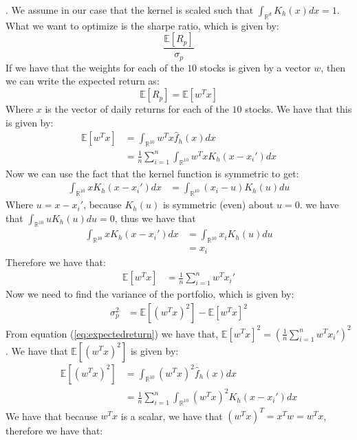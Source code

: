\documentclass[12pt]{article}
\begin{document}
. We assume 
in our  case that the kernel is scaled such that $\int_{\mathbb{R}^d} K_h(x) dx = 1$. What we want to optimize is the sharpe 
ratio, which is given by: 
\begin{equation}
    \frac{\mathbb{E}[R_p]}{\sigma_p}
\end{equation}
If we have that the weights for each of the $10$ stocks is given by a vector $w$, then we can write the expected return as:
\begin{equation}
    \mathbb{E}[R_p] = \mathbb{E}[w^T x]
\end{equation}
Where $x$ is the vector of daily returns for each of the $10$ stocks. We have that this is given by:
\begin{align}
    \mathbb{E}[w^T x] &= \int_{\mathbb{R}^{10}} w^T x \hat{f}_h(x) dx \\
    &= \frac{1}{n} \sum_{i=1}^n\int_{\mathbb{R}^{10}} w^T xK_h(x-x_i') dx
\end{align}
Now we can use the fact that the kernel function is symmetric to get:
\begin{align*}
    \int_{\mathbb{R}^{10}} xK_h(x-x_i') dx & = \int_{\mathbb{R}^{10}} (x_i-u)K_h(u) du 
\end{align*}
Where $u=x-x_i'$, because $K_h(u)$ is symmetric (even) about $u=0$. we have that $\int_{\mathbb{R}^{10}}uK_h(u) du = 0$, thus we have that 
\begin{align}
    \int_{\mathbb{R}^{10}} xK_h(x-x_i') dx & = \int_{\mathbb{R}^{10}}x_iK_h(u) du \\
    &= x_i
\end{align}
Therefore we have that:
\begin{align}
    \mathbb{E}[w^T x] &= \frac{1}{n} \sum_{i=1}^nw^T x_i'
    \label{eq:expectedreturn}
\end{align}
Now we need to find the variance of the portfolio, which is given by:
\begin{align}
    \sigma_p^2 & = \mathbb{E}[(w^T x)^2] - \mathbb{E}[w^T x]^2
    \label{eq:variance}
\end{align}
From equation (\ref{eq:expectedreturn}) we have that, $\mathbb{E}[w^T x]^2=\left(\frac{1}{n} \sum_{i=1}^nw^T x_i'\right)^2$.
We have that $\mathbb{E}[(w^T x)^2]$ is given by:
\begin{align}
    \mathbb{E}[(w^T x)^2] &= \int_{\mathbb{R}^{10}} (w^T x)^2 \hat{f}_h(x) dx \\
    &= \frac{1}{n} \sum_{i=1}^n\int_{\mathbb{R}^{10}} (w^T x)^2 K_h(x-x_i') dx
\end{align}
We have that because $w^Tx$ is a scalar, we have that $(w^Tx)^T=x^Tw=w^Tx$, therefore we have that:
\end{document}
